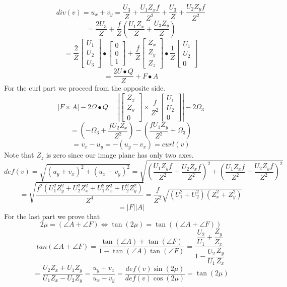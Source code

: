 \documentclass[12pt]{article}
\begin{document}
$$div(v) = u_x + v_y = \dfrac{U_3}{Z} + \dfrac{U_1 Z_x f}{Z^2} + \dfrac{U_3}{Z} + \dfrac{U_2 Z_y f}{Z^2}$$
$$= \dfrac{2U_3}{Z} + \dfrac{f}{Z}\left( \dfrac{U_1 Z_x}{Z} + \dfrac{U_3 Z_y}{Z}\right)$$
$$=\dfrac{2}{Z}\left[  \begin{matrix} U_1 \\ U_2 \\ U_3\end{matrix} \right] \bullet \left[  \begin{matrix} 0 \\ 0 \\ 1\end{matrix} \right] + \dfrac{f}{Z}\left[  \begin{matrix} Z_x  \\ Z_y \\ Z_z \end{matrix} \right] \bullet \dfrac{1}{Z}\left[  \begin{matrix} U_1  \\ U_2 \\ 0 \end{matrix} \right]   $$
$$= \dfrac{2U\bullet Q}{Z}+ F\bullet A$$
For the curl part we proceed from the opposite side.
$$ |F\times A| - 2 \Omega\bullet Q = |\left[  \begin{matrix} Z_x \\ Z_y \\ 0\end{matrix} \right]\times \dfrac{f}{Z^2}\left[  \begin{matrix} U_1 \\ U_2 \\ 0\end{matrix} \right]| -2\Omega_3 $$
$$= \left( -\Omega_3 + \dfrac{fU_2Z_x}{Z^2} \right) - \left( \dfrac{fU_1Z_y}{Z^2} +\Omega_3 \right)$$
$$= v_x - u_y  = - (u_y -v_x) = curl(v)$$
Note that $Z_z$ is zero since our image plane has only two axes.
$$ def(v) = \sqrt{(u_y+v_x)^2 + (u_x-v_y)^2} = \sqrt{(\dfrac{U_1Z_yf}{Z^2} + \dfrac{U_2Z_xf}{Z^2})^2 + (\dfrac{U_1Z_xf}{Z^2} - \dfrac{U_2Z_yf}{Z^2})^2} $$
$$= \sqrt{\dfrac{f^2(U_1^2Z_y^2 + U_2^2Z_x^2 + U_1^2Z_x^2 + U_2^2Z_y^2)}{Z^4}} = \dfrac{f}{Z^2}\sqrt{\left(U_1^2+U_2^2 \right) \left( Z_x^2 + Z_y^2\right)}$$
$$= |F| |A|$$
For the last part we prove that 
$$2\mu = (\angle A+\angle F ) \iff \tan(2\mu) = \tan((\angle A+\angle F ))$$ 
$$ tan(\angle A+\angle F) = \dfrac{\tan(\angle A) + \tan(\angle F)}{1-\tan(\angle A)\tan(\angle F)} = \dfrac{\dfrac{U_2}{U_1} + \dfrac{Z_y}{Z_x}}{1-\dfrac{U_2}{U_1}\dfrac{Z_y}{Z_x}} $$
$$= \dfrac{U_2Z_x + U_1Z_y}{U_1Z_x-U_2Z_y} = \dfrac{u_y+v_x}{u_x-v_y} = \dfrac{def(v)\sin(2\mu)}{def(v)\cos(2\mu)} = \tan(2\mu)$$
\end{document}
